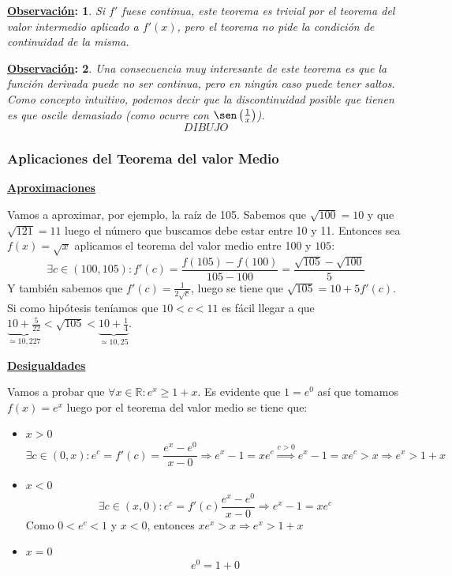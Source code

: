 \documentclass[10pt,a4paper,openright]{book}
\theoremstyle{break}
\newtheorem*{obs}{\underline{Observación}:}
\begin{document}
\begin{obs}
Si $f'$ fuese continua, este teorema es trivial por el teorema del valor intermedio aplicado a $f'(x)$, pero el teorema no pide la condición de continuidad de la misma.
\end{obs}

\begin{obs}
Una consecuencia muy interesante de este teorema es que la función derivada puede no ser continua, pero en ningún caso puede tener saltos. Como concepto intuitivo, podemos decir que la discontinuidad posible que tienen es que oscile demasiado (como ocurre con $\sen\left(\frac{1}{x}\right)$).
$$DIBUJO$$
\end{obs}

\subsubsection{Aplicaciones del Teorema del valor Medio}
\underline{\textbf{Aproximaciones}}

Vamos a aproximar, por ejemplo, la raíz de 105. Sabemos que $\sqrt{100}=10$ y que $\sqrt{121}=11$ luego el número que buscamos debe estar entre 10 y 11. Entonces sea $f(x)=\sqrt{x}$ aplicamos el teorema del valor medio entre 100 y $105$:
$$\exists c\in (100, 105):f'(c)=\frac{f(105)-f(100)}{105-100}=\frac{\sqrt{105}-\sqrt{100}}{5}$$
Y también sabemos que $f'(c)=\frac{1}{2\sqrt{c}}$, luego se tiene que $\sqrt{105}=10+5f'(c)$. Si como hipótesis teníamos que $10<c<11$ es fácil llegar a que $\underbrace{10+\frac{5}{22}}_{\simeq 10,227}< \sqrt{105} < \underbrace{10+\frac{1}{4}}_{\simeq 10,25}$.

\underline{\textbf{Desigualdades}}

Vamos a probar que $\forall x \in \mathbb R: e^x \geq 1+x$. Es evidente que $1=e^0$ así que tomamos $f(x)=e^x$ luego por el teorema del valor medio se tiene que:
\begin{itemize}
\item $x>0$
$$\exists c\in (0,x): e^c=f'(c)=\frac{e^x-e^0}{x-0}\Rightarrow e^x-1=xe^c\stackrel{c>0}{\Rightarrow} e^x-1=xe^c>x\Rightarrow e^x>1+x$$

\item $x<0$
$$\exists c\in (x,0): e^c=f'(c)\frac{e^x-e^0}{x-0}\Rightarrow e^x-1=xe^c$$
Como $0<e^c<1$ y $x<0$, entonces $xe^x>x\Rightarrow e^x>1+x$

\item $x=0$
$$e^0=1+0$$
\end{itemize}
\end{document}
